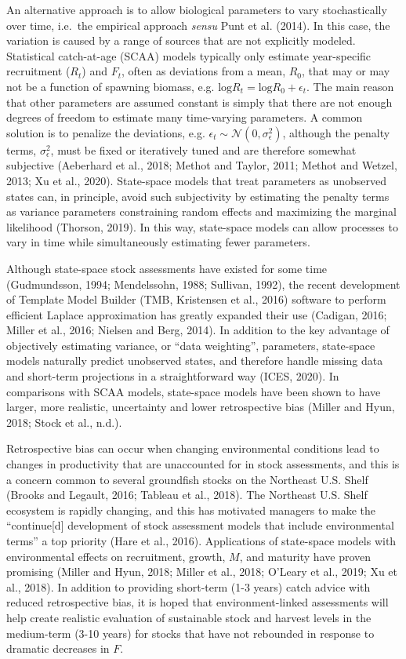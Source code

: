 \documentclass[]{article}
\begin{document}
An alternative approach is to allow biological parameters to vary
stochastically over time, i.e.~the empirical approach \emph{sensu} Punt
et al. (2014). In this case, the variation is caused by a range of
sources that are not explicitly modeled. Statistical catch-at-age (SCAA)
models typically only estimate year-specific recruitment (\(R_t\)) and
\(F_t\), often as deviations from a mean, \(R_0\), that may or may not
be a function of spawning biomass, e.g.
\(\text{log}R_t = \text{log}R_0 + \epsilon_t\). The main reason that
other parameters are assumed constant is simply that there are not
enough degrees of freedom to estimate many time-varying parameters. A
common solution is to penalize the deviations, e.g.
\(\epsilon_t \sim \mathcal{N}(0,\sigma^2_\epsilon)\), although the
penalty terms, \(\sigma^2_\epsilon\), must be fixed or iteratively tuned
and are therefore somewhat subjective (Aeberhard et al., 2018; Methot
and Taylor, 2011; Methot and Wetzel, 2013; Xu et al., 2020). State-space
models that treat parameters as unobserved states can, in principle,
avoid such subjectivity by estimating the penalty terms as variance
parameters constraining random effects and maximizing the marginal
likelihood (Thorson, 2019). In this way, state-space models can allow
processes to vary in time while simultaneously estimating fewer
parameters.

Although state-space stock assessments have existed for some time
(Gudmundsson, 1994; Mendelssohn, 1988; Sullivan, 1992), the recent
development of Template Model Builder (TMB, Kristensen et al., 2016)
software to perform efficient Laplace approximation has greatly expanded
their use (Cadigan, 2016; Miller et al., 2016; Nielsen and Berg, 2014).
In addition to the key advantage of objectively estimating variance, or
``data weighting'', parameters, state-space models naturally predict
unobserved states, and therefore handle missing data and short-term
projections in a straightforward way (ICES, 2020). In comparisons with
SCAA models, state-space models have been shown to have larger, more
realistic, uncertainty and lower retrospective bias (Miller and Hyun,
2018; Stock et al., n.d.).

Retrospective bias can occur when changing environmental conditions lead
to changes in productivity that are unaccounted for in stock
assessments, and this is a concern common to several groundfish stocks
on the Northeast U.S. Shelf (Brooks and Legault, 2016; Tableau et al.,
2018). The Northeast U.S. Shelf ecosystem is rapidly changing, and this
has motivated managers to make the ``continue{[}d{]} development of
stock assessment models that include environmental terms'' a top
priority (Hare et al., 2016). Applications of state-space models with
environmental effects on recruitment, growth, \(M\), and maturity have
proven promising (Miller and Hyun, 2018; Miller et al., 2018; O'Leary et
al., 2019; Xu et al., 2018). In addition to providing short-term (1-3
years) catch advice with reduced retrospective bias, it is hoped that
environment-linked assessments will help create realistic evaluation of
sustainable stock and harvest levels in the medium-term (3-10 years) for
stocks that have not rebounded in response to dramatic decreases in
\(F\).
\end{document}

